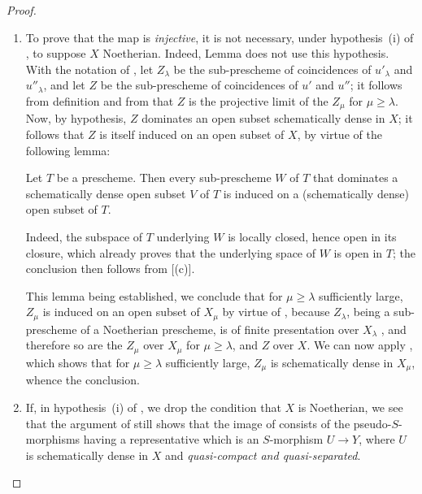 \begin{proof}
\begin{remarks}[20.3.8.7]
\label{IV.20.3.8.7}
\begin{enumerate}[label=(\roman*)]
  \item To prove that the map  is \emph{injective}, it is not necessary, under hypothesis~(i) of , to suppose $X$ Noetherian.
  Indeed, Lemma  does not use this hypothesis.
  With the notation of , let $Z_\lambda$ be the sub-prescheme of coincidences of $u'_\lambda$ and $u''_\lambda$, and let $Z$ be the sub-prescheme of coincidences of $u'$ and $u''$; it follows from definition  and from  that $Z$ is the projective limit of the $Z_\mu$ for $\mu\geq\lambda$.
  Now, by hypothesis, $Z$ dominates an open subset schematically dense in $X$; it follows that $Z$ is itself induced on an open subset of $X$, by virtue of the following lemma:

\begin{lemma}[20.3.8.8]
\label{IV.20.3.8.8}
Let $T$ be a prescheme.
Then every sub-prescheme $W$ of $T$ that dominates a schematically dense open subset $V$ of $T$ is induced on a (schematically dense) open subset of $T$.
\end{lemma}

  Indeed, the subspace of $T$ underlying $W$ is locally closed, hence open
  in its closure, which already proves that the underlying space of $W$ is open in $T$; the conclusion then follows from [(c)].

  This lemma being established, we conclude that for $\mu\geq\lambda$ sufficiently large, $Z_\mu$ is induced on an open subset of $X_\mu$ by virtue of , because $Z_\lambda$, being a sub-prescheme of a Noetherian prescheme, is of finite presentation over $X_\lambda$ , and therefore so are the $Z_\mu$ over $X_\mu$ for $\mu\geq\lambda$, and $Z$ over $X$.
  We can now apply , which shows that for $\mu\geq\lambda$ sufficiently large, $Z_\mu$ is schematically dense in $X_\mu$, whence the conclusion.

  \item If, in hypothesis~(i) of , we drop the condition that $X$ is Noetherian, we see that the argument of  still shows that the image of  consists of the pseudo-$S$-morphisms having a representative which is an $S$-morphism $U\to Y$, where $U$ is schematically dense in $X$ and \emph{quasi-compact and quasi-separated}.
\end{enumerate}
\end{remarks}
\end{proof}

